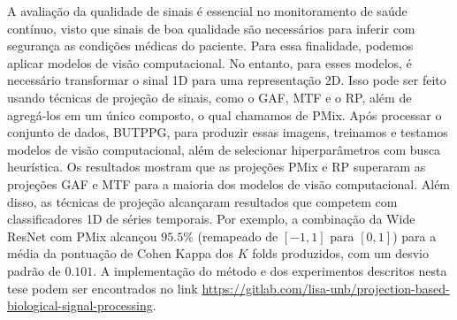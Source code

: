 A avaliação da qualidade de sinais é essencial no monitoramento de saúde contínuo, visto que sinais de boa qualidade são necessários para inferir com segurança as condições médicas do paciente. Para essa finalidade, podemos aplicar modelos de visão computacional. No entanto, para esses modelos, é necessário transformar o sinal 1D para uma representação 2D. Isso pode ser feito usando técnicas de projeção de sinais, como o \acrlong{GAF}, \acrlong{MTF} e o \acrlong{RP}, além de agregá-los em um único composto, o qual chamamos de \acrlong{PMix}. Após processar o conjunto de dados, \acrlong{BUTPPG}, para produzir essas imagens, treinamos e testamos modelos de visão computacional, além de selecionar hiperparâmetros com busca heurística. Os resultados mostram que as projeções \acrlong{PMix} e \acrlong{RP} superaram as projeções \acrlong{GAF} e \acrlong{MTF} para a maioria dos modelos de visão computacional. Além disso, as técnicas de projeção alcançaram resultados que competem com classificadores 1D de séries temporais. Por exemplo, a combinação da Wide ResNet com \acrlong{PMix} alcançou $95.5\%$ (remapeado de $[-1,1]$ para $[0,1]$) para a média da pontuação de Cohen Kappa dos $K$ folds produzidos, com um desvio padrão de $0.101$. A implementação do método e dos experimentos descritos nesta tese podem ser encontrados no link \url{https://gitlab.com/lisa-unb/projection-based-biological-signal-processing}.
